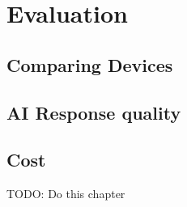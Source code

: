 \chapter{Evaluation}
\label{cha:evaluation}
\section{Comparing Devices}
\section{AI Response quality}
\section{Cost}


TODO: Do this chapter

